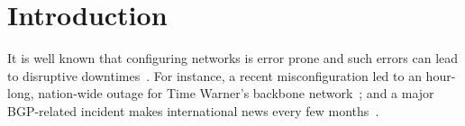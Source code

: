 \documentclass[10pt]{sigalternate052015}
\newcommand{\dpw}[1]{\textcolor{tmlblue}{[dpw: #1]}}
\begin{document}

\printccsdesc



%
%
%
%


\section{Introduction}
\label{sec:introduction}

It is well known that configuring networks is error
prone and such errors can lead to disruptive
downtimes~\cite{mahajan+:bgp-misconfiguration,feamster+:rcc,batfish,dc-failure-study}.
For instance, a recent misconfiguration led to an hour-long, nation-wide outage for Time Warner's backbone network~\cite{time-warner}; and a major BGP-related incident makes international news every few months~\cite{bgpmon}.


\end{document}
